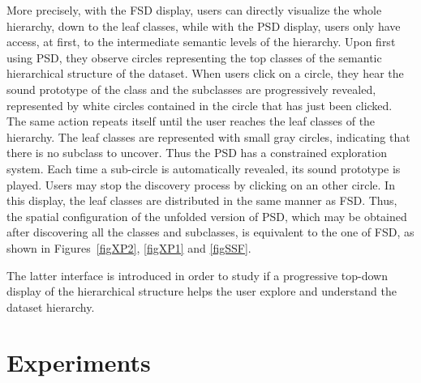 \documentclass{aes2e}
\begin{document}
More precisely, with the FSD display, users can directly visualize the whole hierarchy, down to the leaf classes, while with the PSD display, users only have access, at first, to the intermediate semantic levels of the hierarchy. Upon first using PSD, they observe circles representing the top classes of the semantic hierarchical structure of the dataset. When users click on a circle, they hear the sound prototype of the class and the subclasses are progressively revealed, represented by white circles contained in the circle that has just been clicked. The same action repeats itself until the user reaches the leaf classes of the hierarchy. The leaf classes are represented with small gray circles, indicating that there is no subclass to uncover. Thus the PSD has a constrained exploration system. Each time a sub-circle is automatically revealed, its sound prototype is played. Users may stop the discovery process by clicking on an other circle. In this display, the leaf classes are distributed  in the same manner as FSD. Thus, the spatial configuration of the unfolded version of PSD, which may be obtained after discovering all the classes and subclasses, is equivalent to the one of FSD, as shown in Figures~\ref{figXP2}, \ref{figXP1} and \ref{figSSF}.

The latter interface is introduced in order to study if a progressive top-down display of the hierarchical structure helps the user explore and understand the dataset hierarchy.

%

\section{Experiments} \label{test}
\end{document}
